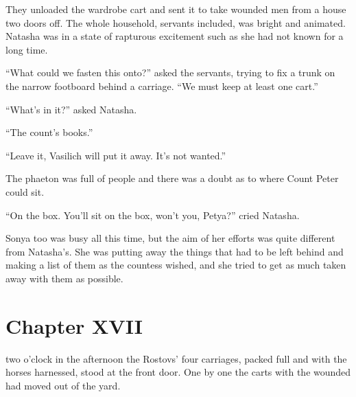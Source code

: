They unloaded the wardrobe cart and sent it to take wounded men
from a house two doors off. The whole household, servants
included, was bright and animated. Natasha was in a state of
rapturous excitement such as she had not known for a long time.

``What could we fasten this onto?'' asked the servants, trying to
fix a trunk on the narrow footboard behind a carriage. ``We must
keep at least one cart.''

``What's in it?'' asked Natasha.

``The count's books.''

``Leave it, Vasilich will put it away. It's not wanted.''

The phaeton was full of people and there was a doubt as to where
Count Peter could sit.

``On the box. You'll sit on the box, won't you, Petya?'' cried
Natasha.

Sonya too was busy all this time, but the aim of her efforts was
quite different from Natasha's. She was putting away the things
that had to be left behind and making a list of them as the
countess wished, and she tried to get as much taken away with
them as possible.


\chapter*{Chapter XVII} \ifaudio {}
\fi

 two o'clock in the afternoon the Rostovs' four carriages,
packed full and with the horses harnessed, stood at the front
door. One by one the carts with the wounded had moved out of the
yard.

